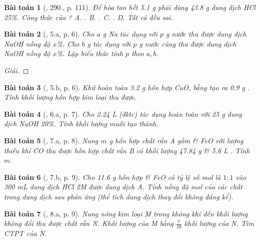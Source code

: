 \documentclass{article}
\newtheorem{baitoan}{Bài toán}
\begin{document}
\begin{baitoan}[\cite{Nguyen_Buu_Can_500_BT_Hoa_Hoc_THCS}, 290., p. 111]
	Để hòa tan hết {\rm5.1 g } phải dùng {\rm43.8 g} dung dịch {\rm HCl 25\%}. Công thức của {\rm{}}? {\rm{\sf A.} . {\sf B.} . {\sf C.} .} {\sf D.} Tất cả đều sai.
\end{baitoan}

\begin{baitoan}[\cite{An_350_BT_Hoa_Hoc_9}, 5.a, p. 6]
	Cho $a$ \emph{g Na} tác dụng với $p$ \emph{g} nước thu được dung dịch \emph{NaOH} nồng độ $x$\%. Cho $b$ \emph{g } tác dụng với $p$ \emph{g} nước cũng thu được dung dịch \emph{NaOH} nồng độ $x$\%. Lập biểu thức tính $p$ theo $a,b$.
\end{baitoan}

\begin{proof}[Giải]
	
\end{proof}

\begin{baitoan}[\cite{An_350_BT_Hoa_Hoc_9}, 5.b, p. 6]
	Khử hoàn toàn \emph{3.2 g} hỗn hợp \emph{CuO, } bằng \emph{} tạo ra \emph{0.9 g }. Tính khối lượng hỗn hợp kim loại thu được.
\end{baitoan}

\begin{baitoan}[\cite{An_350_BT_Hoa_Hoc_9}, 6.a, p. 7]
	Cho \emph{2.24 L } (đktc) tác dụng hoàn toàn với \emph{25 g} dung dịch \emph{NaOH 20\%}. Tính khối lượng muối tạo thành.
\end{baitoan}

\begin{baitoan}[\cite{An_350_BT_Hoa_Hoc_9}, 7.a, p. 8]
	Nung $m$ \emph{g} hỗn hợp chất rắn A gồm \emph{} \& \emph{FeO} với lượng thiếu khí \emph{CO} thu được hỗn hợp chất rắn B có khối lượng \emph{47.84 g} \& \emph{5.6 L }. Tính $m$.
\end{baitoan}

\begin{baitoan}[\cite{An_350_BT_Hoa_Hoc_9}, 7.b, p. 9]
	Cho \emph{11.6 g} hỗn hợp \emph{} \& \emph{FeO} có tỷ lệ số mol là $1:1$ vào \emph{300 mL} dung dịch \emph{HCl 2M} được dung dịch A. Tính nồng độ mol của các chất trong dung dịch sau phản ứng (thể tích dung dịch thay đổi không đáng kể).
\end{baitoan}

\begin{baitoan}[\cite{An_350_BT_Hoa_Hoc_9}, 8.a, p. 9]
	Nung nóng kim loại M trong không khí đến khối lượng không đổi thu được chất rắn N. Khối lượng của M bằng $\frac{7}{10}$ khối lượng của N. Tìm CTPT của N.
\end{baitoan}
\end{document}
